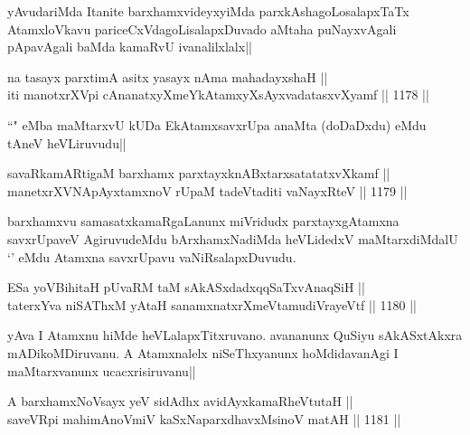 \begin{artha}
yAvudariMda Itanite barxhamxvideyxyiMda parxkAshagoLosalapxTaTx AtamxloVkavu pariceCxVdagoLisalapxDuvado aMtaha puNayxvAgali pApavAgali baMda kamaRvU ivanalilxlalx||
\end{artha}


\begin{shl}
na tasayx parxtimA asitx yasayx nAma mahadayxshaH || \\
iti manotxrXV\s pi cA\s \s nanatxyXmeYkAtamxyXsAyxvadatasxvXyamf ||  1178 ||  
\end{shl}

\begin{artha}
``\stext" eMba maMtarxvU kUDa EkAtamxsavxrUpa anaMta (doDaDxdu) eMdu tAneV heVLiruvudu||
\end{artha}

\begin{shl}
savaRkamARtigaM barxhamx parxtayxknABxtarxsatatatxvXkamf || \\
manetxrXVNApAyxtamxnoV rUpaM tadeVtaditi vaNayxRteV ||  1179 ||  
\end{shl}

\begin{artha}
barxhamxvu samasatxkamaRgaLanunx miVridudx parxtayxgAtamxna savxrUpaveV AgiruvudeMdu bArxhamxNadiMda heVLidedxV maMtarxdiMdalU `\stext' eMdu Atamxna savxrUpavu vaNiRsalapxDuvudu.
\end{artha}



\begin{shl}
ESa yoV\s BihitaH pUvaRM taM sAkASxdadxqqSaTxvAnaqSiH || \\
taterxYva niSAThxM yAtaH sanamxnatxrXmeVtamudiVrayeVtf ||  1180 ||  
\end{shl}

\begin{artha}
yAva I Atamxnu hiMde heVLalapxTitxruvano. avananunx QuSiyu sAkASxtAkxra mADikoMDiruvanu. A Atamxnalelx niSeThxyanunx hoMdidavanAgi I maMtarxvanunx ucacxrisiruvanu||
\end{artha}


\begin{shl}
A barxhamxNoV\s sayx yeV sidAdhx avidAyxkamaRheVtutaH || \\
saveVR\s pi mahimAnoV\s miV kaSxNaparxdhavxMsinoV matAH ||  1181 ||  
\end{shl}

